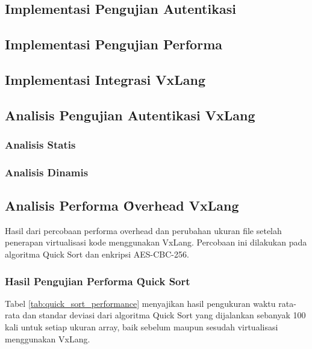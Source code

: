 \chapter{\babEmpat}

\section{Implementasi Pengujian Autentikasi}

\section{Implementasi Pengujian Performa}

\section{Implementasi Integrasi VxLang}

\section{Analisis Pengujian Autentikasi  VxLang}
\subsection{Analisis Statis}
\subsection{Analisis Dinamis}

\section{Analisis Performa \f{Overhead} VxLang}
Hasil dari percobaan performa overhead dan perubahan ukuran file setelah penerapan virtualisasi kode menggunakan VxLang. Percobaan ini dilakukan pada algoritma Quick Sort dan enkripsi AES-CBC-256.

\subsection{Hasil Pengujian Performa \f{Quick Sort}}
Tabel \ref{tab:quick_sort_performance} menyajikan hasil pengukuran waktu rata-rata dan standar deviasi dari algoritma Quick Sort yang dijalankan sebanyak 100 kali untuk setiap ukuran array, baik sebelum maupun sesudah virtualisasi menggunakan VxLang.

